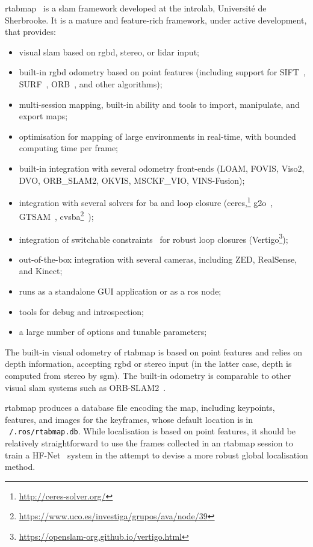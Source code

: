 \documentclass[11pt, letterpaper, twoside]{article}
\begin{document}
\gls{rtabmap}~\cite{labbe2019rtab} is a \gls{slam} framework developed at the
\gls{introlab}, Université de Sherbrooke. It is a mature and feature-rich
framework, under active development, that provides:
\begin{itemize}
    \item visual \gls{slam} based on \gls{rgbd}, stereo, or lidar input;
    \item built-in \gls{rgbd} odometry based on point features (including
        support for SIFT~\cite{lowe1999object}, SURF~\cite{bay2006surf},
        ORB~\cite{rublee2011orb}, and other algorithms);
    \item multi-session mapping, built-in ability and tools to import,
        manipulate, and export maps;
    \item optimisation for mapping of large environments in real-time, with
        bounded computing time per frame;
    \item built-in integration with several odometry front-ends (LOAM, FOVIS,
        Viso2, DVO, ORB\_SLAM2, OKVIS, MSCKF\_VIO, VINS-Fusion);
    \item integration with several solvers for \gls{ba} and loop closure
        (ceres,\footnote{\url{http://ceres-solver.org/}}
        g2o~\cite{grisetti2011g2o}, GTSAM~\cite{dellaert2006square},
        cvsba\footnote{\url{https://www.uco.es/investiga/grupos/ava/node/39}}~\cite{lourakis2009sba});
    \item integration of switchable constraints~\cite{sunderhauf2012switchable}
        for robust loop closures
        (Vertigo\footnote{\url{https://openslam-org.github.io/vertigo.html}});
    \item out-of-the-box integration with several cameras, including ZED,
        RealSense, and Kinect;
    \item runs as a standalone GUI application or as a \gls{ros} node;
    \item tools for debug and introspection;
    \item a large number of options and tunable parameters;
\end{itemize}

The built-in visual odometry of \gls{rtabmap} is based on point features and
relies on depth information, accepting \gls{rgbd} or stereo input (in the
latter case, depth is computed from stereo by \gls{sgm}). The built-in odometry
is comparable to other visual \gls{slam} systems such as
ORB-SLAM2~\cite{ragot2019benchmark}.

\gls{rtabmap} produces a database file encoding the map, including keypoints,
features, and images for the keyframes, whose default location is in
\texttt{~/.ros/rtabmap.db}. While localisation is based on point features, it
should be relatively straightforward to use the frames collected in an
\gls{rtabmap} session to train a HF-Net~\cite{sarlin2019coarse} system in the
attempt to devise a more robust global localisation method.
\end{document}
